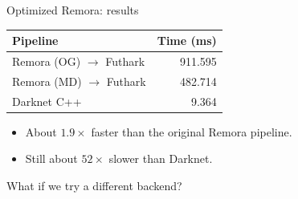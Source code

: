 \documentclass[aspectratio=169,11pt]{beamer}
\begin{document}
\begin{frame}{Optimized Remora: results}
\begin{center}
\renewcommand{\arraystretch}{1.35}
\begin{tabular}{@{}lr@{}}
\toprule
Pipeline & Time (ms)\\\midrule
Remora (OG) $\rightarrow$ Futhark & 911.595\\
Remora (MD) $\rightarrow$ Futhark & 482.714\\
Darknet C++ & 9.364\\\bottomrule
\end{tabular}
\end{center}
\vspace{5mm}
\begin{itemize}\setlength\itemsep{3mm}
\item About $1.9\times$ faster than the original Remora pipeline.
\item Still about $52\times$ slower than Darknet.
\end{itemize}
\vspace{5mm}
{\large\color{accent}What if we try a different backend?}
\end{frame}
\end{document}
